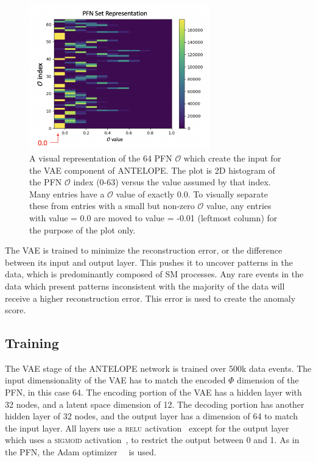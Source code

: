 \begin{figure}[!htbp]
\centering
   \includegraphics[width=0.7\textwidth]{figures/ml/antelope_input_rep}
    \caption{A visual representation of the 64 PFN $\mathcal{O}$ which create the input for the VAE component of ANTELOPE. The plot is 2D histogram of the PFN $\mathcal{O}$ index (0-63) versus the value assumed by that index. Many entries have a $\mathcal{O}$ value of exactly 0.0. To visually separate these from entries with a small but non-zero $\mathcal{O}$ value, any entries with value = 0.0 are moved to value = -0.01 (leftmost column) for the purpose of the plot only.
    \label{fig:antelope_input_rep}}
\end{figure}

The VAE is trained to minimize the reconstruction error, or the difference between its input and output layer. This pushes it to uncover patterns in the data, which is predominantly composed of SM processes. Any rare events in the data which present patterns inconsistent with the majority of the data will receive a higher reconstruction error. This error is used to create the anomaly score. 

\subsection{Training}

The VAE stage of the ANTELOPE network is trained over 500k data events.
The input dimensionality of the VAE has to match the encoded $\Phi$ dimension of the PFN, in this case 64. 
The encoding portion of the VAE has a hidden layer with 32 nodes,  and a latent space dimension of 12.
The decoding portion has another hidden layer of 32 nodes, and the output layer has a dimension of 64 to match the input layer.
All layers use a \textsc{relu} activation~\cite{scikit-learn} except for the output layer which uses a \textsc{sigmoid} activation~\cite{scikit-learn}, to restrict the output between 0 and 1.
As in the PFN, the Adam optimizer~\cite{adam}~\cite{scikit-learn} is used.

